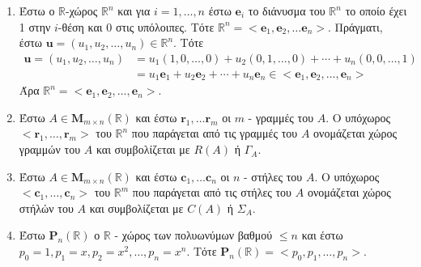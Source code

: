 \begin{examples}
\item {}
    \begin{enumerate}
        \item Έστω ο $ \mathbb{R} $-χώρος $ \mathbb{R}^{n} $ και για $ i= 1,\ldots,n $
            έστω $ \mathbf{e}_{i} $ το διάνυσμα του $ \mathbb{R}^{n} $ το οποίο έχει 
            1 στην $ i $-θέση και 0 στις υπόλοιπες. Τότε $ \mathbb{R}^{n} = 
            < \mathbf{e}_{1}, \mathbf{e}_{2}, \ldots \mathbf{e}_{n} >  $. 
            Πράγματι, έστω $ \mathbf{u} = (u_{1},u_{2},\ldots,u_{n}) \in 
            \mathbb{R}^{n} $. Τότε 
            \begin{align*}
                \mathbf{u} = (u_{1},u_{2},\ldots,u_{n}) 
                &=  u_{1} (1,0,\ldots,0) + u_{2} (0,1,\ldots,0) + 
                \cdots + u_{n} (0,0,\ldots,1) \\
                &= u_{1} \mathbf{e}_{1} + u_{2} \mathbf{e}_{2} + \cdots + u_{n} 
                \mathbf{e}_{n} \in < \mathbf{e}_{1}, \mathbf{e}_{2}, 
                \ldots, \mathbf{e}_{n} >  
            \end{align*} 
            Άρα $ \mathbb{R}^{n} = < \mathbf{e}_{1}, \mathbf{e}_{2}, 
            \ldots, \mathbf{e}_{n} >  $.
        \item Έστω $ A \in \textbf{M}_{m \times n}(\mathbb{R}) $ και έστω 
            $ \mathbf{r}_{1}, \ldots \mathbf{r}_{m} $ οι $m$ - γραμμές του $A$.  
            Ο υπόχωρος $ < \mathbf{r}_{1}, \ldots, \mathbf{r}_{m} >  $ του 
            $ \mathbb{R}^{n} $ που παράγεται από τις γραμμές του $A$ ονομάζεται 
            χώρος γραμμών του $A$ και συμβολίζεται με $ R(A) $ ή $ \Gamma_{A} $.
        \item Έστω $ A \in \textbf{M}_{m \times n}(\mathbb{R}) $ και έστω 
            $ \mathbf{c}_{1}, \ldots \mathbf{c}_{n} $ οι $n$ - στήλες του $A$.  
            Ο υπόχωρος $ < \mathbf{c}_{1}, \ldots, \mathbf{c}_{n} >  $ του 
            $ \mathbb{R}^{m} $ που παράγεται από τις στήλες του $A$ ονομάζεται 
            χώρος στήλών του $A$ και συμβολίζεται με $ C(A) $ ή $ \Sigma_{A} $.
        \item Έστω $ \mathbf{P}_{n}(\mathbb{R}) $ ο $ \mathbb{R} $ - χώρος των 
            πολυωνύμων βαθμού $ \leq n $ και έστω $ p_{0} = 1, p_{1}=x, p_{2}=x^{2}, 
            \ldots, p_{n}=x^{n} $. Τότε $ \mathbf{P}_{n}(\mathbb{R}) = 
            < p_{0}, p_{1}, \ldots, p_{n} > $.
    \end{enumerate}
\end{examples}

